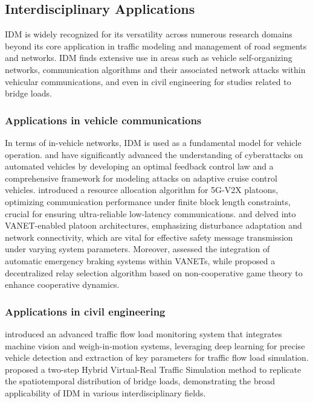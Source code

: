 \documentclass[a4paper,fleqn]{cas-sc}
\begin{document}
\subsection{Interdisciplinary Applications}

 IDM is widely recognized for its versatility across numerous research domains beyond its core application in traffic modeling and management of road segments and networks. IDM finds extensive use in areas such as vehicle self-organizing networks, communication algorithms and their associated network attacks within vehicular communications, and even in civil engineering for studies related to bridge loads.

\subsubsection{Applications in vehicle communications}

In terms of in-vehicle networks, IDM is used as a fundamental model for vehicle operation. \cite{wangOptimalFeedbackControlLaw2023a} and \cite{wang_analytical_2024} have significantly advanced the understanding of cyberattacks on automated vehicles by developing an optimal feedback control law and a comprehensive framework for modeling attacks on adaptive cruise control vehicles. \cite{dongDynamicManagerSelectionAssisted2022a} introduced a resource allocation algorithm for 5G-V2X platoons, optimizing communication performance under finite block length constraints, crucial for ensuring ultra-reliable low-latency communications. \cite{jiaDisturbanceAdaptiveDesignVANETenabledVehicle2014a} and \cite{jiaNetworkConnectivityPlatoonBasedVehicular2014a} delved into VANET-enabled platoon architectures, emphasizing disturbance adaptation and network connectivity, which are vital for effective safety message transmission under varying system parameters. Moreover,  \cite{segataAutomaticEmergencyBrakingRealistic2013a} assessed the integration of automatic emergency braking systems within VANETs, while \cite{tianSelfOrganizedRelaySelectionCooperative2017a} proposed a decentralized relay selection algorithm based on non-cooperative game theory to enhance cooperative dynamics. 

\subsubsection{Applications in civil engineering}

\cite{ge_intelligent_2022} introduced an advanced traffic flow load monitoring system that integrates machine vision and weigh-in-motion  systems, leveraging deep learning for precise vehicle detection and extraction of key parameters for traffic flow load simulation.  \cite{zhou_hybrid_2024} proposed a two-step Hybrid Virtual-Real Traffic Simulation method to replicate the spatiotemporal distribution of bridge loads, demonstrating the broad applicability of IDM in various interdisciplinary fields.
\end{document}
